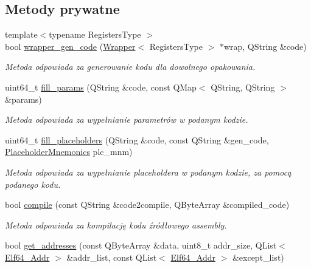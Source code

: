 \subsection*{Metody prywatne}
\begin{DoxyCompactItemize}
\item 
{\footnotesize template$<$typename Registers\-Type $>$ }\\bool \hyperlink{class_e_l_f_adding_methods_a5aba8ac68c5596fcd306563b3b1dc42d}{wrapper\-\_\-gen\-\_\-code} (\hyperlink{class_d_adding_methods_1_1_wrapper}{Wrapper}$<$ Registers\-Type $>$ $\ast$wrap, Q\-String \&code)
\begin{DoxyCompactList}\small\item\em Metoda odpowiada za generowanie kodu dla dowolnego opakowania. \end{DoxyCompactList}\item 
uint64\-\_\-t \hyperlink{class_e_l_f_adding_methods_a173aef7c3ca6dfd00a26676b7b1c799c}{fill\-\_\-params} (Q\-String \&code, const Q\-Map$<$ Q\-String, Q\-String $>$ \&params)
\begin{DoxyCompactList}\small\item\em Metoda odpowiada za wypełnianie parametrów w podanym kodzie. \end{DoxyCompactList}\item 
uint64\-\_\-t \hyperlink{class_e_l_f_adding_methods_a1c71c7b3681912661e529ac4878dc8d8}{fill\-\_\-placeholders} (Q\-String \&code, const Q\-String \&gen\-\_\-code, \hyperlink{class_e_l_f_adding_methods_a666b28eeb9569323a4f697d37c6a1022}{Placeholder\-Mnemonics} plc\-\_\-mnm)
\begin{DoxyCompactList}\small\item\em Metoda odpowiada za wypełnianie placeholdera w podanym kodzie, za pomocą podanego kodu. \end{DoxyCompactList}\item 
bool \hyperlink{class_e_l_f_adding_methods_a2d8f6c6b99d1f3e22d9196cd70e9c017}{compile} (const Q\-String \&code2compile, Q\-Byte\-Array \&compiled\-\_\-code)
\begin{DoxyCompactList}\small\item\em Metoda odpowiada za kompilację kodu źródłowego assembly. \end{DoxyCompactList}\item 
bool \hyperlink{class_e_l_f_adding_methods_aea9b58dda2bc9b6216a01c3970b1f214}{get\-\_\-addresses} (const Q\-Byte\-Array \&data, uint8\-\_\-t addr\-\_\-size, Q\-List$<$ \hyperlink{elf_8h_aeed51d08e3a950d637f8ec1f0cd4ef65}{Elf64\-\_\-\-Addr} $>$ \&addr\-\_\-list, const Q\-List$<$ \hyperlink{elf_8h_aeed51d08e3a950d637f8ec1f0cd4ef65}{Elf64\-\_\-\-Addr} $>$ \&except\-\_\-list)

\end{DoxyCompactItemize}
